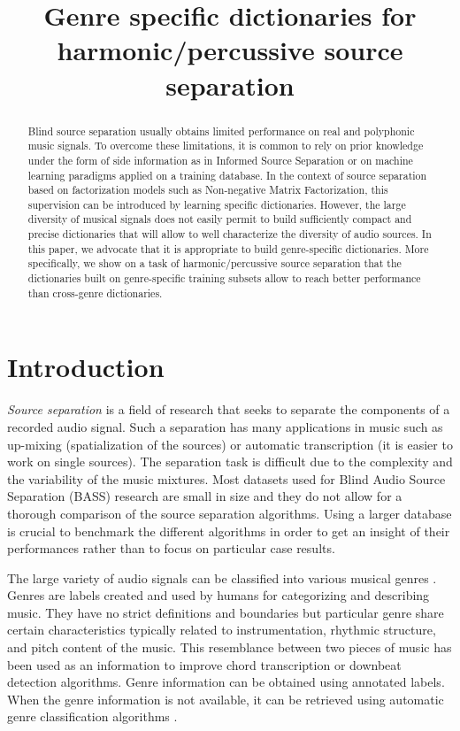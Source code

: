 \documentclass{article}
\title{Genre specific dictionaries for harmonic/percussive source separation}
\begin{document}
%
\maketitle
%


\begin{abstract}

Blind source separation usually obtains limited performance on real and polyphonic music signals. To overcome these limitations, it is common to rely on prior knowledge under the form of side information as in Informed Source Separation or on machine learning paradigms applied on a training database. In the context of source separation based on factorization models such as Non-negative Matrix Factorization, this supervision can be introduced by learning specific dictionaries. However, the large diversity of musical signals does not easily permit to build sufficiently compact and precise dictionaries that will allow to well characterize the diversity of audio sources. In this paper, we advocate that it is appropriate to build genre-specific dictionaries. More specifically, we show on a task of harmonic/percussive source separation that the dictionaries built on genre-specific training subsets allow to reach better performance than cross-genre dictionaries.



\end{abstract}
%
\section{Introduction}\label{sec:introduction}


\emph{Source separation} is a field of research that seeks to separate the components of a recorded audio signal. Such a separation has many applications in music such as up-mixing \cite{fitzgerald2011upmixing} (spatialization of the sources) or automatic transcription \cite{vincent2010adaptive} (it is easier to work on single sources). The separation task is difficult due to the complexity and the variability of the music mixtures. Most datasets used for Blind Audio Source Separation (BASS) research are small in size and they do not allow for a thorough comparison of the source separation algorithms. Using a larger database is crucial to benchmark the different algorithms in order to get an insight of their performances rather than to focus on particular case results.%

The large variety of audio signals can be classified into various musical genres \cite{tzanetakis2002musical}. Genres are labels created and used by humans for categorizing and describing music. They have no strict definitions and boundaries but particular genre share certain characteristics typically related to instrumentation, rhythmic structure, and pitch content of the music. This resemblance between two pieces of music has been used as an information to improve chord transcription \cite{ni2012using,lee2008acoustic} or downbeat detection \cite{hockman2012one} algorithms. Genre information can be obtained using annotated labels. When the genre information is not available, it can be retrieved using automatic genre classification algorithms \cite{tzanetakis2002musical,mckay2006musical}.
\end{document}

